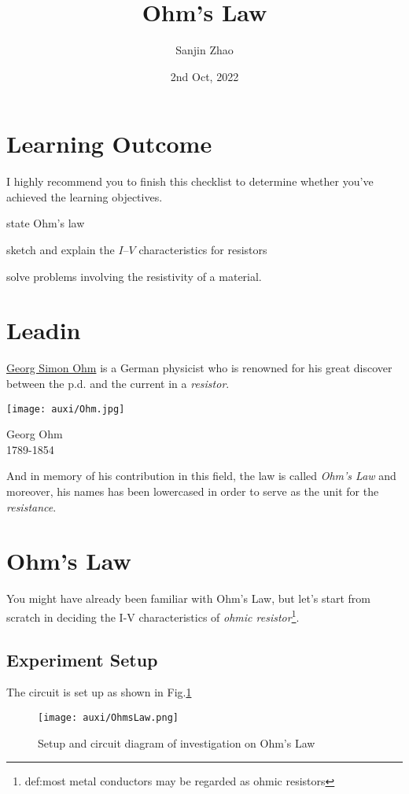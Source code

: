\documentclass[a4paper]{tufte-handout}
\title{Ohm's Law}
\author{Sanjin Zhao}
\date{2nd Oct, 2022}  %
\begin{document}
\maketitle%
\section*{Learning Outcome}
I highly recommend you to finish this checklist to determine whether you've achieved the learning objectives.
\begin{todolist}
  \item state Ohm’s law
  \item sketch and explain the $I$–$V$ characteristics for resistors
  \item solve problems involving the resistivity of a material.
\end{todolist}
\clearpage

\section{Leadin}
\href{https://www.britannica.com/biography/Georg-Ohm}{Georg Simon Ohm} is a German physicist who is renowned for his great discover between the p.d. and the current in a \emph{resistor}.
\begin{marginfigure}
\texttt{[image: auxi/Ohm.jpg]}
\caption{Georg Ohm\\1789-1854}
\end{marginfigure}
And in memory of his contribution in this field, the law is called \emph{Ohm's Law} and moreover, his names has been lowercased in order to serve as the unit for the \emph{resistance}.

\section{Ohm's Law}
You might have already been familiar with Ohm's Law, but let's start from scratch in deciding the I-V characteristics of \emph{ohmic resistor}\footnote{def:most metal conductors may be regarded as ohmic resistors}. 
\subsection{Experiment Setup}
The circuit is set up as shown in Fig.\ref{fig:Ohm setup}
\begin{figure}[h]
\centering
\texttt{[image: auxi/OhmsLaw.png]}
\caption{Setup and circuit diagram of investigation on Ohm's Law}
\label{fig:Ohm setup}
\end{figure}
\end{document}
